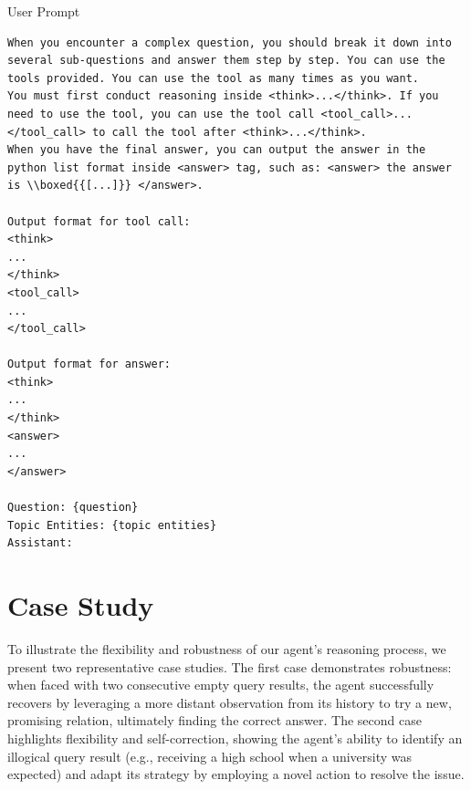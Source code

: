 \begin{examplebox}{User Prompt}
\begin{lstlisting}
When you encounter a complex question, you should break it down into several sub-questions and answer them step by step. You can use the tools provided. You can use the tool as many times as you want.
You must first conduct reasoning inside <think>...</think>. If you need to use the tool, you can use the tool call <tool_call>...</tool_call> to call the tool after <think>...</think>.
When you have the final answer, you can output the answer in the python list format inside <answer> tag, such as: <answer> the answer is \\boxed{{[...]}} </answer>.

Output format for tool call:
<think>
...
</think>
<tool_call>
...
</tool_call>

Output format for answer:
<think>
...
</think>
<answer>
...
</answer>

Question: {question}
Topic Entities: {topic entities}
Assistant:
\end{lstlisting}
\end{examplebox}
\section{Case Study}
\label{app:case}
To illustrate the flexibility and robustness of our agent's reasoning process, we present two representative case studies. The first case demonstrates robustness: when faced with two consecutive empty query results, the agent successfully recovers by leveraging a more distant observation from its history to try a new, promising relation, ultimately finding the correct answer. The second case highlights flexibility and self-correction, showing the agent's ability to identify an illogical query result (e.g., receiving a high school when a university was expected) and adapt its strategy by employing a novel action to resolve the issue.

